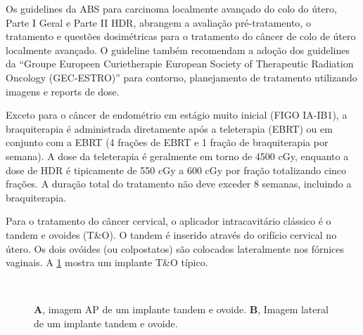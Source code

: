 \documentclass[11pt,a4paper]{article}
\begin{document}
	Os guidelines da ABS para carcinoma localmente avançado do colo do útero, Parte I Geral e Parte II HDR, abrangem a avaliação pré-tratamento, o tratamento e questões dosimétricas para o tratamento do câncer de colo de útero localmente avançado. O guideline também recomendam a adoção dos guidelines da ``Groupe Europeen Curietherapie European Society of Therapeutic Radiation Oncology (GEC-ESTRO)'' para contorno, planejamento de tratamento utilizando imagens e reports de dose.

	Exceto para o câncer de endométrio em estágio muito inicial (FIGO IA-IB1), a braquiterapia é administrada diretamente após a teleterapia (EBRT) ou em conjunto com a EBRT (4 frações de EBRT e 1 fração de braquiterapia por semana). A dose da teleterapia é geralmente em torno de 4500 cGy, enquanto a dose de HDR é tipicamente de 550 cGy a 600 cGy por fração totalizando cinco frações. A duração total do tratamento não deve exceder 8 semanas, incluindo a braquiterapia.

	Para o tratamento do câncer cervical, o aplicador intracavitário clássico é o tandem e ovoides (T\&O). O tandem é inserido através do orifício cervical no útero. Os dois ovóides (ou colpostatos) são colocados lateralmente nos fórnices vaginais. A \ref{fig:implanteOvoide} mostra um implante T\&O típico.

	\begin{figure}[h]
		\centering
		 \\ %
		\caption{\textbf{A}, imagem AP de um implante tandem e ovoide. \textbf{B}, Imagem lateral de um implante tandem e ovoide.}
		\label{fig:implanteOvoide}
	\end{figure}
\end{document}
